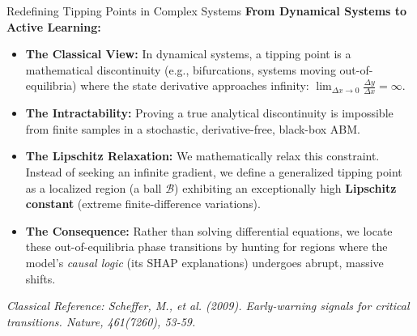 \documentclass[10pt, aspectratio=169]{beamer}
\begin{document}
\begin{frame}[fragile]{Redefining Tipping Points in Complex Systems}
  \textbf{From Dynamical Systems to Active Learning:}
  \begin{itemize}
      \item \textbf{The Classical View:} In dynamical systems, a tipping point is a mathematical discontinuity (e.g., bifurcations, systems moving out-of-equilibria) where the state derivative approaches infinity: $\lim_{\Delta x \to 0} \frac{\Delta y}{\Delta x} = \infty$.
      \item \textbf{The Intractability:} Proving a true analytical discontinuity is impossible from finite samples in a stochastic, derivative-free, black-box ABM.
      \item \textbf{The Lipschitz Relaxation:} We mathematically relax this constraint. Instead of seeking an infinite gradient, we define a generalized tipping point as a localized region (a ball $\mathcal{B}$) exhibiting an exceptionally high \textbf{Lipschitz constant} (extreme finite-difference variations).
      \item \textbf{The Consequence:} Rather than solving differential equations, we locate these out-of-equilibria phase transitions by hunting for regions where the model's \textit{causal logic} (its SHAP explanations) undergoes abrupt, massive shifts.
  \end{itemize}
  
  \vspace{0.3cm}
  \footnotesize{\textit{Classical Reference: Scheffer, M., et al. (2009). Early-warning signals for critical transitions. Nature, 461(7260), 53-59.}}
\end{frame}
\end{document}

